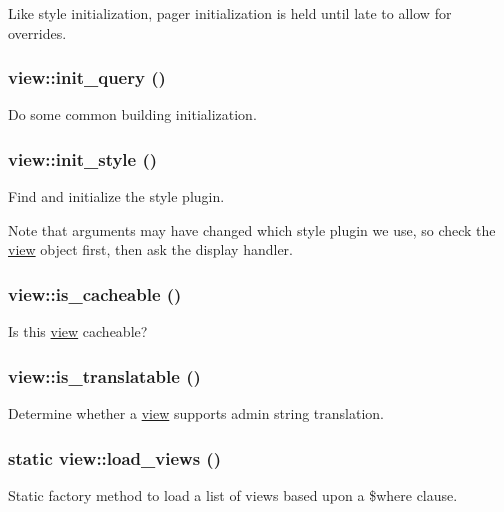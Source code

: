 Like style initialization, pager initialization is held until late to allow for overrides. \hypertarget{classview_af71eca2ca74a696efe9be2b7cd6fee8f}{
\subsubsection[{init\_\-query}]{\setlength{\rightskip}{0pt plus 5cm}view::init\_\-query ()}}
\label{classview_af71eca2ca74a696efe9be2b7cd6fee8f}
Do some common building initialization. \hypertarget{classview_a22ea4e41e69fadff64193a54a63a24e9}{
\subsubsection[{init\_\-style}]{\setlength{\rightskip}{0pt plus 5cm}view::init\_\-style ()}}
\label{classview_a22ea4e41e69fadff64193a54a63a24e9}
Find and initialize the style plugin.

Note that arguments may have changed which style plugin we use, so check the \hyperlink{classview}{view} object first, then ask the display handler. \hypertarget{classview_aca962e114d7d15eb16dd3b3616e5a96d}{
\subsubsection[{is\_\-cacheable}]{\setlength{\rightskip}{0pt plus 5cm}view::is\_\-cacheable ()}}
\label{classview_aca962e114d7d15eb16dd3b3616e5a96d}
Is this \hyperlink{classview}{view} cacheable? \hypertarget{classview_aafe1c7a6b96d17ffebaa88bace1a3d2d}{
\subsubsection[{is\_\-translatable}]{\setlength{\rightskip}{0pt plus 5cm}view::is\_\-translatable ()}}
\label{classview_aafe1c7a6b96d17ffebaa88bace1a3d2d}
Determine whether a \hyperlink{classview}{view} supports admin string translation. \hypertarget{classview_a2e9d3d4c2d3c490b4d395f034691920a}{
\subsubsection[{load\_\-views}]{\setlength{\rightskip}{0pt plus 5cm}static view::load\_\-views ()}}
\label{classview_a2e9d3d4c2d3c490b4d395f034691920a}
Static factory method to load a list of views based upon a \$where clause.

